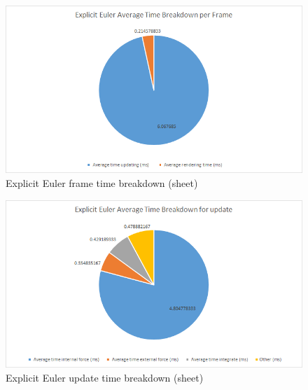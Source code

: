     \begin{figure}
    \begin{center}
      \includegraphics[scale=.9]{Figures/sheet_ee_ft}
    \end{center}
    \caption{Explicit Euler frame time breakdown (sheet)}
    \label{fig:ee ft sheet}
  \end{figure}
  
    \begin{figure}
    \begin{center}
      \includegraphics[scale=.9]{Figures/sheet_ee_ut}
    \end{center}
    \caption{Explicit Euler update time breakdown (sheet)}
    \label{fig:ee ut sheet}
  \end{figure}
  
